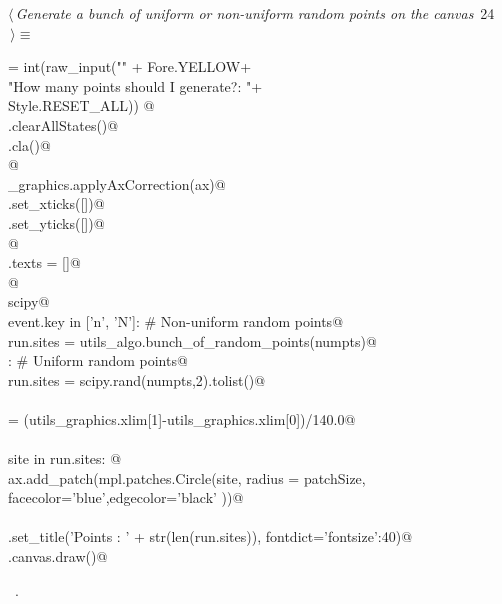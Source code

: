 \documentclass[11.5pt]{report}
\begin{document}
\begin{flushleft} \small\label{scrap18}\raggedright\small
{} $\langle\,${\itshape Generate a bunch of uniform or non-uniform random points on the canvas}\nobreak\ {\footnotesize {24}}$\,\rangle\equiv$
\vspace{-1ex}
\begin{list}{}{} \item
\mbox{}\verb@numpts = int(raw_input("\n" + Fore.YELLOW+\@\\
\mbox{}\verb@                       "How many points should I generate?: "+\@\\
\mbox{}\verb@                       Style.RESET_ALL)) @\\
\mbox{}\verb@run.clearAllStates()@\\
\mbox{}\verb@ax.cla()@\\
\mbox{}\verb@               @\\
\mbox{}\verb@utils_graphics.applyAxCorrection(ax)@\\
\mbox{}\verb@ax.set_xticks([])@\\
\mbox{}\verb@ax.set_yticks([])@\\
\mbox{}\verb@                @\\
\mbox{}\verb@fig.texts = []@\\
\mbox{}\verb@                 @\\
\mbox{}\verb@import scipy@\\
\mbox{}\verb@if event.key in ['n', 'N']: # Non-uniform random points@\\
\mbox{}\verb@        run.sites = utils_algo.bunch_of_random_points(numpts)@\\
\mbox{}\verb@else : # Uniform random points@\\
\mbox{}\verb@        run.sites = scipy.rand(numpts,2).tolist()@\\
\mbox{}\verb@@\\
\mbox{}\verb@patchSize  = (utils_graphics.xlim[1]-utils_graphics.xlim[0])/140.0@\\
\mbox{}\verb@@\\
\mbox{}\verb@for site in run.sites:      @\\
\mbox{}\verb@    ax.add_patch(mpl.patches.Circle(site, radius = patchSize, \@\\
\mbox{}\verb@                 facecolor='blue',edgecolor='black' ))@\\
\mbox{}\verb@@\\
\mbox{}\verb@ax.set_title('Points : ' + str(len(run.sites)), fontdict={'fontsize':40})@\\
\mbox{}\verb@fig.canvas.draw()@\\
\mbox{}\verb@@{\NWsep}
\end{list}
\vspace{-1.5ex}
\footnotesize
\begin{list}{}{\setlength{\itemsep}{-\parsep}\setlength{\itemindent}{-\leftmargin}}
\item \NWtxtMacroRefIn\ .

\item{}
\end{list}
\vspace{4ex}
\end{flushleft}
\end{document}
